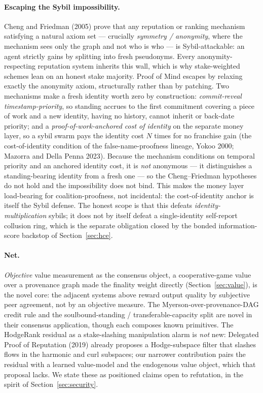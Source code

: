 \documentclass[10pt]{article}
\begin{document}
\paragraph{Escaping the Sybil impossibility.} Cheng and Friedman (2005) prove that any
reputation or ranking mechanism satisfying a natural axiom set --- crucially \emph{symmetry /
anonymity}, where the mechanism sees only the graph and not who is who --- is Sybil-attackable: an agent
strictly gains by splitting into fresh pseudonyms. Every anonymity-respecting reputation system inherits
this wall, which is why stake-weighted schemes lean on an honest stake majority. Proof of Mind escapes by
relaxing exactly the anonymity axiom, structurally rather than by patching. Two mechanisms make a fresh
identity worth zero by construction: \emph{commit-reveal timestamp-priority}, so standing accrues to the
first commitment covering a piece of work and a new identity, having no history, cannot inherit or
back-date priority; and a \emph{proof-of-work-anchored cost of identity} on the separate money layer, so
a sybil swarm pays the identity cost $N$ times for no franchise gain (the cost-of-identity condition of
the false-name-proofness lineage, Yokoo 2000; Mazorra and Della Penna 2023). Because the mechanism
conditions on temporal priority and an anchored identity cost, it is \emph{not} anonymous --- it
distinguishes a standing-bearing identity from a fresh one --- so the Cheng--Friedman hypotheses do not
hold and the impossibility does not bind. This makes the money layer load-bearing for coalition-proofness,
not incidental: the cost-of-identity anchor is itself the Sybil defense. The honest scope is that this
defeats \emph{identity-multiplication} sybils; it does not by itself defeat a single-identity
self-report collusion ring, which is the separate obligation closed by the bonded information-score
backstop of Section~\ref{sec:hce}.

\paragraph{Net.} \emph{Objective} value measurement as the consensus object, a cooperative-game value
over a provenance graph made the finality weight directly (Section~\ref{sec:value}), is the novel core:
the adjacent systems above reward output quality by subjective peer agreement, not by an objective
measure. The Myerson-over-provenance-DAG credit rule and the soulbound-standing / transferable-capacity
split are novel in their consensus application, though each composes known primitives. The HodgeRank
residual as a stake-slashing manipulation alarm is \emph{not} new: Delegated Proof of Reputation (2019)
already proposes a Hodge-subspace filter that slashes flows in the harmonic and curl subspaces; our
narrower contribution pairs the residual with a learned value-model and the endogenous value object,
which that proposal lacks. We state these as positioned claims open to refutation, in the spirit of
Section~\ref{sec:security}.
\end{document}
